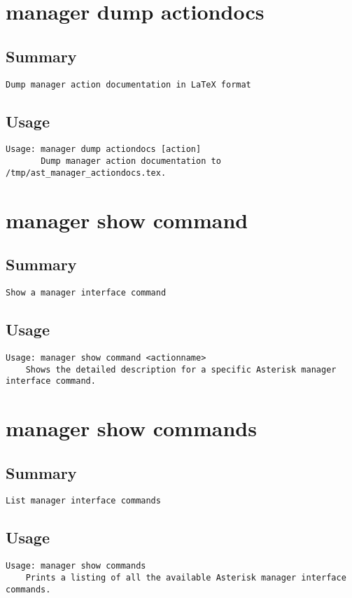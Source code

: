 \section{manager dump actiondocs}
\subsection{Summary}
\begin{verbatim}
Dump manager action documentation in LaTeX format
\end{verbatim}
\subsection{Usage}
\begin{verbatim}
Usage: manager dump actiondocs [action]
       Dump manager action documentation to /tmp/ast_manager_actiondocs.tex.

\end{verbatim}


\section{manager show command}
\subsection{Summary}
\begin{verbatim}
Show a manager interface command
\end{verbatim}
\subsection{Usage}
\begin{verbatim}
Usage: manager show command <actionname>
	Shows the detailed description for a specific Asterisk manager interface command.

\end{verbatim}


\section{manager show commands}
\subsection{Summary}
\begin{verbatim}
List manager interface commands
\end{verbatim}
\subsection{Usage}
\begin{verbatim}
Usage: manager show commands
	Prints a listing of all the available Asterisk manager interface commands.

\end{verbatim}


